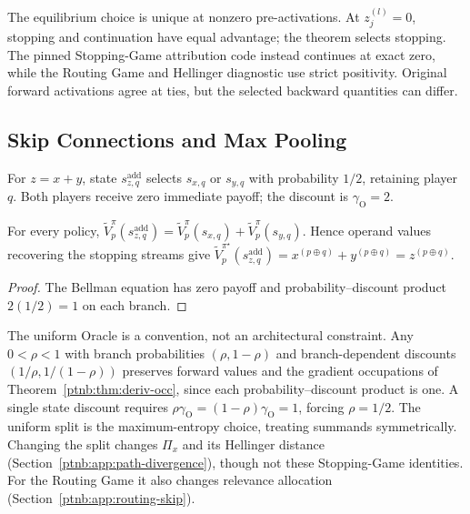 \begin{remark}\label{ptnb:rem:adf-spne-uniqueness}
The equilibrium choice is unique at nonzero pre-activations. At $z_j^{(l)}=0$, stopping and
continuation have equal advantage; the theorem selects stopping. The pinned Stopping-Game
attribution code instead continues at exact zero, while the Routing Game and Hellinger diagnostic
use strict positivity. Original forward activations agree at ties, but the selected backward
quantities can differ.
\end{remark}

\subsection{Skip Connections and Max Pooling}\label{ptnb:app:skip-connections}

\begin{definition}\label{ptnb:def:addition-subgame}
For $z=x+y$, state $s_{z,q}^{\mathrm{add}}$ selects $s_{x,q}$ or $s_{y,q}$ with probability
$1/2$, retaining player $q$. Both players receive zero immediate payoff; the discount is
$\gamma_{\mathrm O}=2$.
\end{definition}
\begin{proposition}\label{ptnb:prop:addition-equivalence}
For every policy,
$\tilde V_p^\pi(s_{z,q}^{\mathrm{add}})=\tilde V_p^\pi(s_{x,q})+\tilde V_p^\pi(s_{y,q})$.
Hence operand values recovering the stopping streams give
$\tilde V_p^{\pi^\star}(s_{z,q}^{\mathrm{add}})=x^{(p\oplus q)}+y^{(p\oplus q)}=z^{(p\oplus q)}$.
\end{proposition}
\begin{proof}
The Bellman equation has zero payoff and probability--discount product $2(1/2)=1$ on each branch.
\end{proof}

The uniform Oracle is a convention, not an architectural constraint. Any $0<\rho<1$ with branch
probabilities $(\rho,1-\rho)$ and branch-dependent discounts $(1/\rho,1/(1-\rho))$ preserves
forward values and the gradient occupations of Theorem~\ref{ptnb:thm:deriv-occ}, since each
probability--discount product is one. A single state discount requires
$\rho\gamma_{\mathrm O}=(1-\rho)\gamma_{\mathrm O}=1$, forcing $\rho=1/2$.
The uniform split is the maximum-entropy choice, treating summands symmetrically. Changing the split changes
$\Pi_x$ and its Hellinger distance (Section~\ref{ptnb:app:path-divergence}), though not these
Stopping-Game identities. For the Routing Game it also changes relevance allocation
(Section~\ref{ptnb:app:routing-skip}).

